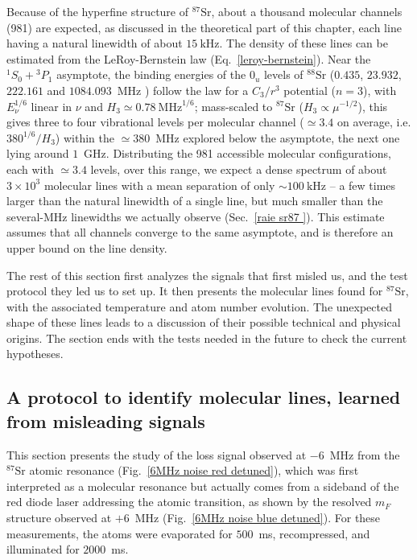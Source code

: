 Because of the hyperfine structure of $^{87}\text{Sr}$, about a thousand molecular channels (981) are
expected, as discussed in the theoretical part of this chapter, each line having a natural
linewidth of about $15~\text{kHz}$.
The density of these lines can be estimated from the LeRoy-Bernstein law
(Eq.~\ref{leroy-bernstein}). Near the $^1S_0+{}^3P_1$ asymptote, the binding energies of
the $0_u$ levels of $^{88}\text{Sr}$ ($0.435$, $23.932$, $222.161$ and $1084.093$~MHz
\cite{zelevinsky_narrow_2006}) follow the law for a $C_3/r^3$ potential ($n=3$), with
$E_\nu^{1/6}$ linear in $\nu$ and $H_3\simeq0.78~\text{MHz}^{1/6}$; mass-scaled to
$^{87}\text{Sr}$ ($H_3\propto\mu^{-1/2}$), this gives three to four vibrational levels per
molecular channel ($\simeq3.4$ on average, i.e. $380^{1/6}/H_3$) within the $\simeq380$~MHz explored below the asymptote, the next one
lying around $1$~GHz. Distributing the 981 accessible molecular configurations, each with
$\simeq3.4$ levels, over this range, we expect a dense spectrum of about $3\times10^3$
molecular lines with a mean separation of only $\sim 100~\text{kHz}$ -- a few times larger
than the natural linewidth of a single line, but much smaller than the several-MHz
linewidths we actually observe (Sec.~\ref{raie sr87 }). This estimate assumes that all
channels converge to the same asymptote, and is therefore an upper bound on the line
density.


The rest of this section first analyzes the signals that first
misled us, and the test protocol they led us to set up. It then presents
the molecular lines found for $^{87}\text{Sr}$, with the associated
temperature and atom number evolution. The unexpected shape of these lines leads to a
discussion of their possible technical and physical origins. The section ends with the
tests needed in the future to check the current hypotheses.


\subsection{A protocol to identify molecular lines, learned from misleading signals}
This section presents the study of the loss signal observed at $-6$~MHz from the
$^{87}\text{Sr}$ atomic resonance (Fig.~\ref{6MHz noise red detuned}), which was first
interpreted as a molecular resonance but actually comes from a sideband of the red diode
laser addressing the atomic transition, as shown by the resolved $m_F$ structure observed at
$+6$~MHz (Fig.~\ref{6MHz noise blue detuned}). For these measurements, the atoms were evaporated
for $500$~ms, recompressed, and illuminated for $2000$~ms.

